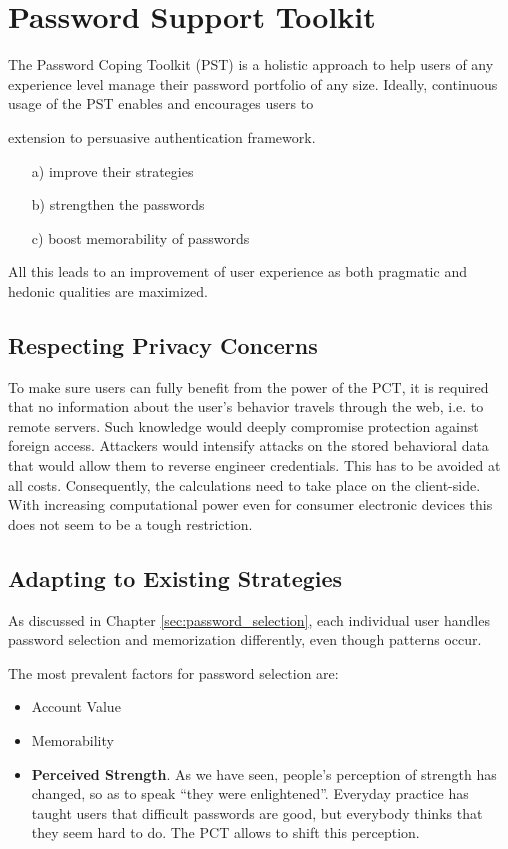 
\chapter[Password Support Toolkit]{Password Support Toolkit}\label{chap:pct_intro}
The Password Coping Toolkit (PST) is a holistic approach to help users of any experience level manage their password portfolio of any size. Ideally, continuous usage of the PST enables and encourages users to 

extension to persuasive authentication framework. 

\begin{enumerate}
\item[a)] improve their strategies
\item[b)] strengthen the passwords
\item[c)] boost memorability of passwords
\end{enumerate}
All this leads to an improvement of user experience as both pragmatic and hedonic qualities are maximized. 

\section{Respecting Privacy Concerns}
To make sure users can fully benefit from the power of the PCT, it is required that no information about the user's behavior travels through the web, i.e. to remote servers. Such knowledge would deeply compromise protection against foreign access. Attackers would intensify attacks on the stored behavioral data that would allow them to reverse engineer credentials. This has to be avoided at all costs. Consequently, the calculations need to take place on the client-side. With increasing computational power even for consumer electronic devices this does not seem to be a tough restriction. 

\section{Adapting to Existing Strategies}
As discussed in Chapter \ref{sec:password_selection}, each individual user handles password selection and memorization differently, even though patterns occur. 

The most prevalent factors for password selection are:
\begin{itemize}
\item Account Value
\item Memorability
\item \textbf{Perceived Strength}. As we have seen, people's perception of strength has changed, so as to speak ``they were enlightened''. Everyday practice has taught users that difficult passwords are good, but everybody thinks that they seem hard to do. The PCT allows to shift this perception. 
\end{itemize}

